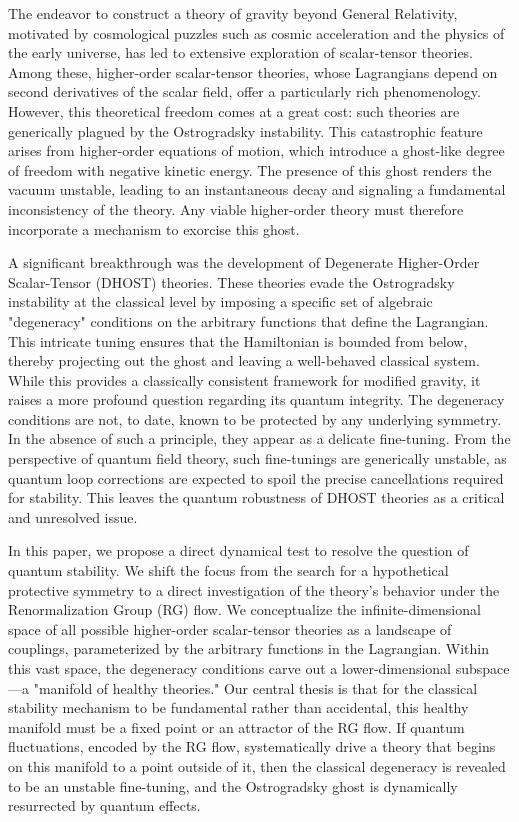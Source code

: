 \documentclass[twocolumn]{aastex631}
\begin{document}
The endeavor to construct a theory of gravity beyond General Relativity, motivated by cosmological puzzles such as cosmic acceleration and the physics of the early universe, has led to extensive exploration of scalar-tensor theories. Among these, higher-order scalar-tensor theories, whose Lagrangians depend on second derivatives of the scalar field, offer a particularly rich phenomenology. However, this theoretical freedom comes at a great cost: such theories are generically plagued by the Ostrogradsky instability. This catastrophic feature arises from higher-order equations of motion, which introduce a ghost-like degree of freedom with negative kinetic energy. The presence of this ghost renders the vacuum unstable, leading to an instantaneous decay and signaling a fundamental inconsistency of the theory. Any viable higher-order theory must therefore incorporate a mechanism to exorcise this ghost.

A significant breakthrough was the development of Degenerate Higher-Order Scalar-Tensor (DHOST) theories. These theories evade the Ostrogradsky instability at the classical level by imposing a specific set of algebraic "degeneracy" conditions on the arbitrary functions that define the Lagrangian. This intricate tuning ensures that the Hamiltonian is bounded from below, thereby projecting out the ghost and leaving a well-behaved classical system. While this provides a classically consistent framework for modified gravity, it raises a more profound question regarding its quantum integrity. The degeneracy conditions are not, to date, known to be protected by any underlying symmetry. In the absence of such a principle, they appear as a delicate fine-tuning. From the perspective of quantum field theory, such fine-tunings are generically unstable, as quantum loop corrections are expected to spoil the precise cancellations required for stability. This leaves the quantum robustness of DHOST theories as a critical and unresolved issue.

In this paper, we propose a direct dynamical test to resolve the question of quantum stability. We shift the focus from the search for a hypothetical protective symmetry to a direct investigation of the theory's behavior under the Renormalization Group (RG) flow. We conceptualize the infinite-dimensional space of all possible higher-order scalar-tensor theories as a landscape of couplings, parameterized by the arbitrary functions in the Lagrangian. Within this vast space, the degeneracy conditions carve out a lower-dimensional subspace---a "manifold of healthy theories." Our central thesis is that for the classical stability mechanism to be fundamental rather than accidental, this healthy manifold must be a fixed point or an attractor of the RG flow. If quantum fluctuations, encoded by the RG flow, systematically drive a theory that begins on this manifold to a point outside of it, then the classical degeneracy is revealed to be an unstable fine-tuning, and the Ostrogradsky ghost is dynamically resurrected by quantum effects.
\end{document}
